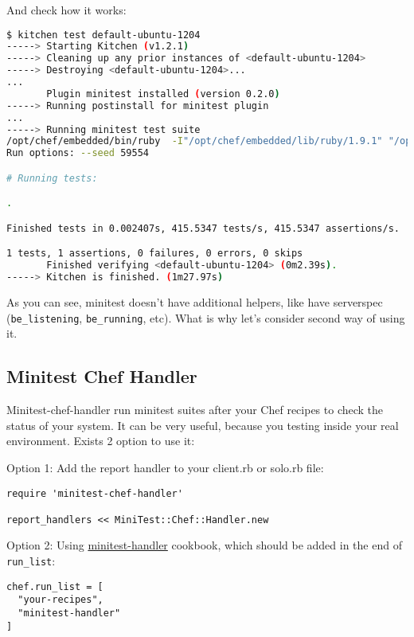 And check how it works:

\begin{lstlisting}[language=Bash,label=lst:testing-minitest2]
$ kitchen test default-ubuntu-1204
-----> Starting Kitchen (v1.2.1)
-----> Cleaning up any prior instances of <default-ubuntu-1204>
-----> Destroying <default-ubuntu-1204>...
...
       Plugin minitest installed (version 0.2.0)
-----> Running postinstall for minitest plugin
...
-----> Running minitest test suite
/opt/chef/embedded/bin/ruby  -I"/opt/chef/embedded/lib/ruby/1.9.1" "/opt/chef/embedded/lib/ruby/1.9.1/rake/rake_test_loader.rb" "/tmp/busser/suites/minitest/test_default.rb"
Run options: --seed 59554

# Running tests:

.

Finished tests in 0.002407s, 415.5347 tests/s, 415.5347 assertions/s.

1 tests, 1 assertions, 0 failures, 0 errors, 0 skips
       Finished verifying <default-ubuntu-1204> (0m2.39s).
-----> Kitchen is finished. (1m27.97s)
\end{lstlisting}

As you can see, minitest doesn't have additional helpers, like have serverspec (\lstinline!be_listening!, \lstinline!be_running!, etc). What is why let's consider second way of using it.

\subsection{Minitest Chef Handler}

Minitest-chef-handler run minitest suites after your Chef recipes to check the status of your system. It can be very useful, because you testing inside your real environment. Exists 2 option to use it:

Option 1: Add the report handler to your client.rb or solo.rb file:

\begin{lstlisting}[label=lst:testing-minitest3]
require 'minitest-chef-handler'

report_handlers << MiniTest::Chef::Handler.new
\end{lstlisting}

Option 2: Using \href{https://github.com/btm/minitest-handler-cookbook}{minitest-handler} cookbook, which should be added in the end of \lstinline!run_list!:

\begin{lstlisting}[label=lst:testing-minitest4]
chef.run_list = [
  "your-recipes",
  "minitest-handler"
]
\end{lstlisting}

